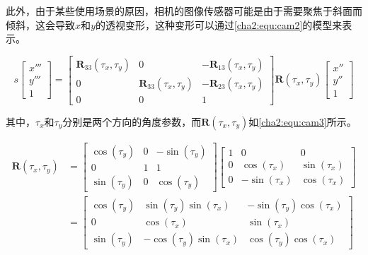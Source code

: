 此外，由于某些使用场景的原因，相机的图像传感器可能是由于需要聚焦于斜面而倾斜，这会导致$x$和$y$的透视变形，这种变形可以通过\ref{cha2:equ:cam2}的模型来表示。

\begin{equation}
\label{cha2:equ:cam2}
  s\begin{bmatrix}
    x'''\\
    y'''\\
    1
  \end{bmatrix} = \begin{bmatrix}
    \mathbf{R}_{33}(\tau_x,\tau_y) & 0 & -\mathbf{R}_{13}(\tau_x,\tau_y)\\
    0 & \mathbf{R}_{33}(\tau_x,\tau_y) & -\mathbf{R}_{23}(\tau_x,\tau_y)\\
    0 & 0 & 1
  \end{bmatrix} \mathbf{R}(\tau_x,\tau_y)\begin{bmatrix}
    x''\\
    y''\\
    1
  \end{bmatrix}
\end{equation}

其中，$\tau_x$和$\tau_y$分别是两个方向的角度参数，而$\mathbf{R}(\tau_x,\tau_y)$如\ref{cha2:equ:cam3}所示。

\begin{equation}
\label{cha2:equ:cam3}
\begin{aligned}
  \mathbf{R}(\tau_x,\tau_y) &= \begin{bmatrix}
    \cos(\tau_y) & 0 & -\sin(\tau_y)\\
    0 & 1 & 1\\
    \sin(\tau_y) & 0 & \cos(\tau_y)
  \end{bmatrix}\begin{bmatrix}
    1 & 0 & 0\\
    0 & \cos(\tau_x) & \sin(\tau_x)\\
    0 & -\sin(\tau_x) & \cos(\tau_x)
  \end{bmatrix}\\ &= \begin{bmatrix}
    \cos(\tau_y) & \sin(\tau_y)\sin(\tau_x) & -\sin(\tau_y)\cos(\tau_x)\\
    0 & \cos(\tau_x) & \sin(\tau_x)\\
    \sin(\tau_y) & -\cos(\tau_y)\sin(\tau_x) & \cos(\tau_y)\cos(\tau_x)
  \end{bmatrix} 
\end{aligned}
\end{equation}

